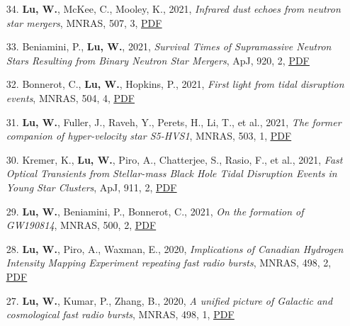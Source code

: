 \begin{itemize}[leftmargin=0.65cm]
\vspace{-0.1cm}
\item[34.]{{\bf Lu, W.}, McKee, C., Mooley, K., 2021, {\it Infrared dust echoes from neutron star mergers}, MNRAS, 507, 3, \href{https://ui.adsabs.harvard.edu/abs/2021MNRAS.507.3672L}{\underline{PDF}}}

\vspace{-0.1cm}
\item[33.]{Beniamini, P., {\bf Lu, W.}, 2021, {\it Survival Times of Supramassive Neutron Stars Resulting from Binary Neutron Star Mergers}, ApJ, 920, 2, \href{https://ui.adsabs.harvard.edu/abs/2021ApJ...920..109B}{\underline{PDF}}}

\vspace{-0.1cm}
\item[32.]{Bonnerot, C., {\bf Lu, W.}, Hopkins, P., 2021, {\it First light from tidal disruption events}, MNRAS, 504, 4, \href{https://ui.adsabs.harvard.edu/abs/2021MNRAS.504.4885B}{\underline{PDF}}}

\vspace{-0.1cm}
\item[31.]{{\bf Lu, W.}, Fuller, J., Raveh, Y., Perets, H., Li, T., et al., 2021, {\it The former companion of hyper-velocity star S5-HVS1}, MNRAS, 503, 1, \href{https://ui.adsabs.harvard.edu/abs/2021MNRAS.503..603L}{\underline{PDF}}}

\vspace{-0.1cm}
\item[30.]{Kremer, K., {\bf Lu, W.}, Piro, A., Chatterjee, S., Rasio, F., et al., 2021, {\it Fast Optical Transients from Stellar-mass Black Hole Tidal Disruption Events in Young Star Clusters}, ApJ, 911, 2, \href{https://ui.adsabs.harvard.edu/abs/2021ApJ...911..104K}{\underline{PDF}}}

\vspace{-0.1cm}
\item[29.]{{\bf Lu, W.}, Beniamini, P., Bonnerot, C., 2021, {\it On the formation of GW190814}, MNRAS, 500, 2, \href{https://ui.adsabs.harvard.edu/abs/2021MNRAS.500.1817L}{\underline{PDF}}}

\vspace{-0.1cm}
\item[28.]{{\bf Lu, W.}, Piro, A., Waxman, E., 2020, {\it Implications of Canadian Hydrogen Intensity Mapping Experiment repeating fast radio bursts}, MNRAS, 498, 2, \href{https://ui.adsabs.harvard.edu/abs/2020MNRAS.498.1973L}{\underline{PDF}}}

\vspace{-0.1cm}
\item[27.]{{\bf Lu, W.}, Kumar, P., Zhang, B., 2020, {\it A unified picture of Galactic and cosmological fast radio bursts}, MNRAS, 498, 1, \href{https://ui.adsabs.harvard.edu/abs/2020MNRAS.498.1397L}{\underline{PDF}}}


\end{itemize}
